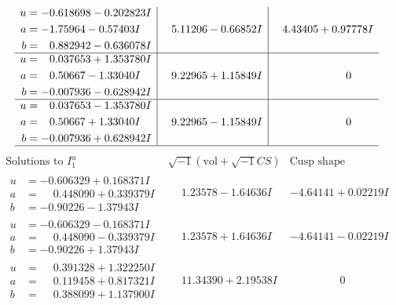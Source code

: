 \documentclass[1p]{elsarticle_modified}
\theoremstyle{definition}
\newcommand{\I}{\sqrt{-1}}
\begin{document}
$$\begin{array}{c|c|c}
\begin{aligned}
u &= -0.618698 - 0.202823 I \\
a &= -1.75964 - 0.57403 I \\
b &= \phantom{-}0.882942 - 0.636078 I\end{aligned}
 & \phantom{-}5.11206 - 0.66852 I & \phantom{-}4.43405 + 0.97778 I \\ \hline\begin{aligned}
u &= \phantom{-}0.037653 + 1.353780 I \\
a &= \phantom{-}0.50667 - 1.33040 I \\
b &= -0.007936 - 0.628942 I\end{aligned}
 & \phantom{-}9.22965 + 1.15849 I & \phantom{-0.000000 } 0 \\ \hline\begin{aligned}
u &= \phantom{-}0.037653 - 1.353780 I \\
a &= \phantom{-}0.50667 + 1.33040 I \\
b &= -0.007936 + 0.628942 I\end{aligned}
 & \phantom{-}9.22965 - 1.15849 I & \phantom{-0.000000 } 0\\
 \hline 
 \end{array}$$\newpage$$\begin{array}{c|c|c}  
\text{Solutions to }I^u_{1}& \I (\text{vol} + \sqrt{-1}CS) & \text{Cusp shape}\\
 \hline 
\begin{aligned}
u &= -0.606329 + 0.168371 I \\
a &= \phantom{-}0.448090 + 0.339379 I \\
b &= -0.90226 - 1.37943 I\end{aligned}
 & \phantom{-}1.23578 - 1.64636 I & -4.64141 + 0.02219 I \\ \hline\begin{aligned}
u &= -0.606329 - 0.168371 I \\
a &= \phantom{-}0.448090 - 0.339379 I \\
b &= -0.90226 + 1.37943 I\end{aligned}
 & \phantom{-}1.23578 + 1.64636 I & -4.64141 - 0.02219 I \\ \hline\begin{aligned}
u &= \phantom{-}0.391328 + 1.322250 I \\
a &= \phantom{-}0.119458 + 0.817321 I \\
b &= \phantom{-}0.388099 + 1.137900 I\end{aligned}
 & \phantom{-}11.34390 + 2.19538 I & \phantom{-0.000000 } 0 \\ \hline\begin{aligned}

\end{aligned}
\end{array}$$
\end{document}
